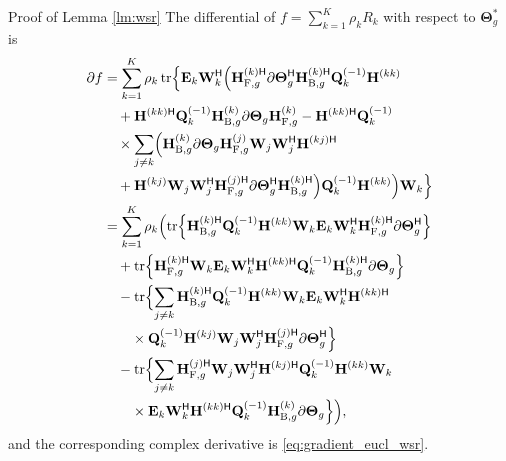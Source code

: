 \documentclass[journal]{IEEEtran}
\begin{document}
\begin{appendix}
	\begin{subsection}{Proof of Lemma \ref{lm:wsr}}
		\label{ap:wsr}
		The differential of $f = \sum_{k=1}^K \rho_k R_k$ with respect to $\mathbf{\Theta}_g^*$ is
		\begin{align*}
			\partial f
			& = \sum_{k=1}^K \rho_k \operatorname{tr} \Bigl\{ \mathbf{E}_k \mathbf{W}_k^\mathsf{H} \Bigl( \mathbf{H}_{\mathrm{F},g}^{(k)\mathsf{H}} \partial \mathbf{\Theta}_g^\mathsf{H} \mathbf{H}_{\mathrm{B},g}^{(k)\mathsf{H}} \mathbf{Q}_k^{(-1)} \mathbf{H}^{(kk)} \\
			& \quad + \mathbf{H}^{(kk)\mathsf{H}} \mathbf{Q}_k^{(-1)} \mathbf{H}_{\mathrm{B},g}^{(k)} \partial \mathbf{\Theta}_g \mathbf{H}_{\mathrm{F},g}^{(k)} - \mathbf{H}^{(kk)\mathsf{H}} \mathbf{Q}_k^{(-1)} \\
			& \quad \times \sum_{j \ne k} \Bigl(\mathbf{H}_{\mathrm{B},g}^{(k)} \partial \mathbf{\Theta}_g \mathbf{H}_{\mathrm{F},g}^{(j)} \mathbf{W}_j \mathbf{W}_j^\mathsf{H} \mathbf{H}^{(kj)\mathsf{H}} \\
			& \quad + \mathbf{H}^{(kj)} \mathbf{W}_j \mathbf{W}_j^\mathsf{H} \mathbf{H}_{\mathrm{F},g}^{(j)\mathsf{H}} \partial \mathbf{\Theta}_g^\mathsf{H} \mathbf{H}_{\mathrm{B},g}^{(k)\mathsf{H}} \Bigr) \mathbf{Q}_k^{(-1)} \mathbf{H}^{(kk)} \Bigr) \mathbf{W}_k \Bigr\} \\
			& = \sum_{k=1}^K \rho_k \Bigl( \operatorname{tr} \Bigl\{ \mathbf{H}_{\mathrm{B},g}^{(k)\mathsf{H}} \mathbf{Q}_k^{(-1)} \mathbf{H}^{(kk)} \mathbf{W}_k \mathbf{E}_k \mathbf{W}_k^\mathsf{H} \mathbf{H}_{\mathrm{F},g}^{(k)\mathsf{H}} \partial \mathbf{\Theta}_g^\mathsf{H}\Bigr\} \\
			& \quad + \operatorname{tr} \Bigl\{ \mathbf{H}_{\mathrm{F},g}^{(k)\mathsf{H}} \mathbf{W}_k \mathbf{E}_k \mathbf{W}_k^\mathsf{H} \mathbf{H}^{(kk)\mathsf{H}} \mathbf{Q}_k^{(-1)} \mathbf{H}_{\mathrm{B},g}^{(k)\mathsf{H}} \partial \mathbf{\Theta}_g \Bigr\} \\
			& \quad - \operatorname{tr} \Bigl\{ \sum_{j \ne k} \mathbf{H}_{\mathrm{B},g}^{(k)\mathsf{H}} \mathbf{Q}_k^{(-1)} \mathbf{H}^{(kk)} \mathbf{W}_k \mathbf{E}_k \mathbf{W}_k^\mathsf{H} \mathbf{H}^{(kk)\mathsf{H}} \\
			& \quad \quad \times \mathbf{Q}_k^{(-1)} \mathbf{H}^{(kj)} \mathbf{W}_j \mathbf{W}_j^\mathsf{H} \mathbf{H}_{\mathrm{F},g}^{(j)\mathsf{H}} \partial \mathbf{\Theta}_g^\mathsf{H} \Bigr\} \\
			& \quad - \operatorname{tr} \Bigl\{ \sum_{j \ne k} \mathbf{H}_{\mathrm{F},g}^{(j)\mathsf{H}} \mathbf{W}_j \mathbf{W}_j^\mathsf{H} \mathbf{H}^{(kj)\mathsf{H}} \mathbf{Q}_k^{(-1)} \mathbf{H}^{(kk)} \mathbf{W}_k \\
			& \quad \quad \times \mathbf{E}_k \mathbf{W}_k^\mathsf{H} \mathbf{H}^{(kk)\mathsf{H}} \mathbf{Q}_k^{(-1)} \mathbf{H}_{\mathrm{B},g}^{(k)} \partial \mathbf{\Theta}_g \Bigr\} \Bigr),
		\end{align*}
		and the corresponding complex derivative is \eqref{eq:gradient_eucl_wsr}.
	\end{subsection}


\end{appendix}
\end{document}
